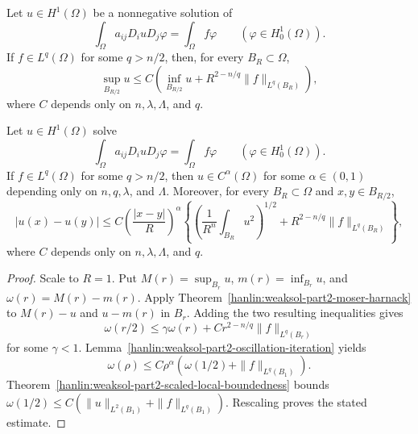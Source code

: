 \begin{theorem}\label{hanlin:weaksol-part2-moser-harnack}
Let $u\in H^1(\Omega)$ be a nonnegative solution of
\[
\int_\Omega a_{ij}D_i uD_j\varphi
=\int_\Omega f\varphi
\qquad(\varphi\in H^1_0(\Omega)).
\]
If $f\in L^q(\Omega)$ for some $q>n/2$, then, for every
$B_R\subset\Omega$,
\[
\sup_{B_{R/2}}u
\leq C\left(\inf_{B_{R/2}}u
+R^{2-n/q}\|f\|_{L^q(B_R)}\right),
\]
where $C$ depends only on $n,\lambda,\Lambda$, and $q$.
\end{theorem}

\begin{corollary}\label{hanlin:weaksol-part2-moser-holder}
Let $u\in H^1(\Omega)$ solve
\[
\int_\Omega a_{ij}D_i uD_j\varphi
=\int_\Omega f\varphi
\qquad(\varphi\in H^1_0(\Omega)).
\]
If $f\in L^q(\Omega)$ for some $q>n/2$, then
$u\in C^\alpha(\Omega)$ for some $\alpha\in(0,1)$ depending only on
$n,q,\lambda$, and $\Lambda$. Moreover, for every $B_R\subset\Omega$ and
$x,y\in B_{R/2}$,
\[
|u(x)-u(y)|
\leq C\left(\frac{|x-y|}{R}\right)^\alpha
\left\{
\left(\frac1{R^n}\int_{B_R}u^2\right)^{1/2}
+R^{2-n/q}\|f\|_{L^q(B_R)}\right\},
\]
where $C$ depends only on $n,\lambda,\Lambda$, and $q$.
\end{corollary}
\begin{proof}
\sketch Scale to $R=1$. Put
$M(r)=\sup_{B_r}u$, $m(r)=\inf_{B_r}u$, and
$\omega(r)=M(r)-m(r)$. Apply
Theorem~\ref{hanlin:weaksol-part2-moser-harnack} to
$M(r)-u$ and $u-m(r)$ in $B_r$. Adding the two resulting inequalities gives
\[
\omega(r/2)\leq\gamma\omega(r)
+Cr^{2-n/q}\|f\|_{L^q(B_r)}
\]
for some $\gamma<1$.
Lemma~\ref{hanlin:weaksol-part2-oscillation-iteration} yields
\[
\omega(\rho)\leq C\rho^\alpha
\left(\omega(1/2)+\|f\|_{L^q(B_1)}\right).
\]
Theorem~\ref{hanlin:weaksol-part2-scaled-local-boundedness} bounds
$\omega(1/2)\leq C(\|u\|_{L^2(B_1)}+\|f\|_{L^q(B_1)})$.
Rescaling proves the stated estimate.
\end{proof}

